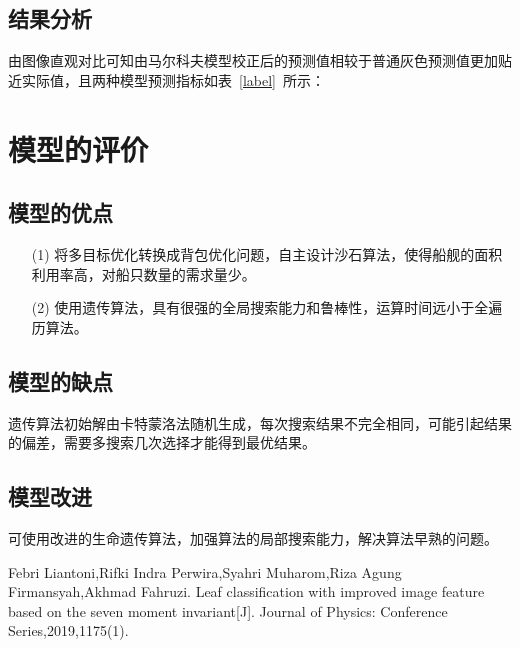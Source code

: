 \documentclass{whutmod}
\begin{document}
   \subsection{结果分析}
   由图像直观对比可知由马尔科夫模型校正后的预测值相较于普通灰色预测值更加贴近实际值，且两种模型预测指标如表~\ref{label}~所示：

	  


    
	\section{模型的评价}
	\subsection{模型的优点}
		\begin{itemize}                                             

		\item [(1)] 将多目标优化转换成背包优化问题，自主设计沙石算法，使得船舰的面积利用率高，对船只数量的需求量少。
		\item [(2)] 使用遗传算法，具有很强的全局搜索能力和鲁棒性，运算时间远小于全遍历算法。
	\end{itemize}
	\subsection{模型的缺点}

	遗传算法初始解由卡特蒙洛法随机生成，每次搜索结果不完全相同，可能引起结果的偏差，需要多搜索几次选择才能得到最优结果。
	\subsection{模型改进}
	可使用改进的生命遗传算法，加强算法的局部搜索能力，解决算法早熟的问题。

 
	\newpage	%
	\nocite{*}		%
%
%	
\begin{thebibliography}{9}%
	Febri Liantoni,Rifki Indra Perwira,Syahri Muharom,Riza Agung Firmansyah,Akhmad Fahruzi. Leaf classification with improved image feature based on the seven moment invariant[J]. Journal of Physics: Conference Series,2019,1175(1).

\end{thebibliography}
\end{document}

